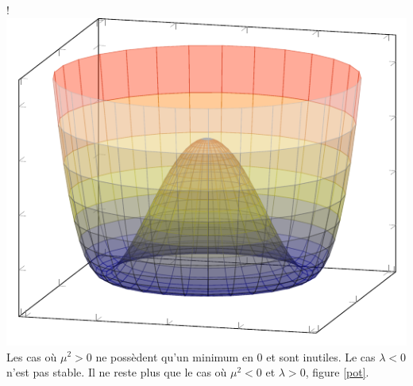 {{}
\resizebox {\marginparwidth} {!} 
{
	\includegraphics[scale=1]{SM/mp.pdf}
}
\label{profile}
}
Les cas où $\mu^{2}>0$ ne possèdent qu'un minimum en $0$ et sont inutiles. Le cas $\lambda<0$ n'est pas stable. Il ne reste plus que le cas où $\mu^{2}<0$ et $\lambda>0$, figure \ref{pot}.

